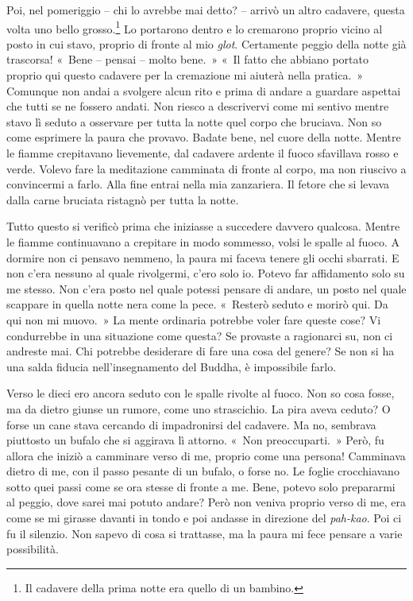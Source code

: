 Poi, nel pomeriggio -- chi lo avrebbe mai detto? -- arrivò un altro
cadavere, questa volta uno bello grosso.\footnote{Il cadavere della
  prima notte era quello di un bambino.} Lo portarono dentro e lo
cremarono proprio vicino al posto in cui stavo, proprio di fronte al mio
\emph{glot}. Certamente peggio della notte già trascorsa! «~Bene --
pensai -- molto bene.~» «~Il fatto che abbiano portato proprio qui
questo cadavere per la cremazione mi aiuterà nella pratica.~» Comunque
non andai a svolgere alcun rito e prima di andare a guardare aspettai
che tutti se ne fossero andati. Non riesco a descrivervi come mi sentivo
mentre stavo lì seduto a osservare per tutta la notte quel corpo che
bruciava. Non so come esprimere la paura che provavo. Badate bene, nel
cuore della notte. Mentre le fiamme crepitavano lievemente, dal cadavere
ardente il fuoco sfavillava rosso e verde. Volevo fare la meditazione
camminata di fronte al corpo, ma non riuscivo a convincermi a farlo.
Alla fine entrai nella mia zanzariera. Il fetore che si levava dalla
carne bruciata ristagnò per tutta la notte.

Tutto questo si verificò prima che iniziasse a succedere davvero
qualcosa. Mentre le fiamme continuavano a crepitare in modo sommesso,
volsi le spalle al fuoco. A dormire non ci pensavo nemmeno, la paura mi
faceva tenere gli occhi sbarrati. E non c'era nessuno al quale
rivolgermi, c'ero solo io. Potevo far affidamento solo su me stesso. Non
c'era posto nel quale potessi pensare di andare, un posto nel quale
scappare in quella notte nera come la pece. «~Resterò seduto e morirò
qui. Da qui non mi muovo.~» La mente ordinaria potrebbe voler fare
queste cose? Vi condurrebbe in una situazione come questa? Se provaste a
ragionarci su, non ci andreste mai. Chi potrebbe desiderare di fare una
cosa del genere? Se non si ha una salda fiducia nell'insegnamento del
Buddha, è impossibile farlo.

Verso le dieci ero ancora seduto con le spalle rivolte al fuoco. Non so
cosa fosse, ma da dietro giunse un rumore, come uno strascichio. La pira
aveva ceduto? O forse un cane stava cercando di impadronirsi del
cadavere. Ma no, sembrava piuttosto un bufalo che si aggirava lì
attorno. «~Non preoccuparti.~» Però, fu allora che iniziò a camminare
verso di me, proprio come una persona! Camminava dietro di me, con il
passo pesante di un bufalo, o forse no. Le foglie crocchiavano sotto
quei passi come se ora stesse di fronte a me. Bene, potevo solo
prepararmi al peggio, dove sarei mai potuto andare? Però non veniva
proprio verso di me, era come se mi girasse davanti in tondo e poi
andasse in direzione del \emph{pah-kao}. Poi ci fu il silenzio. Non
sapevo di cosa si trattasse, ma la paura mi fece pensare a varie
possibilità.

